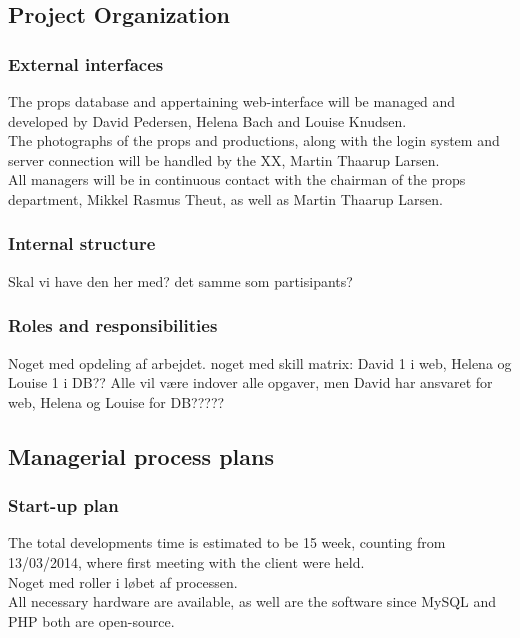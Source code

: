 \documentclass[12pt]{article}
\begin{document}
\subsection{Project Organization}
\subsubsection{External interfaces}
The props database and appertaining web-interface will be managed and developed by David Pedersen, Helena Bach and Louise Knudsen. \\
The photographs of the props and productions, along with the login system and server connection will be handled by the XX, Martin Thaarup Larsen. \\
All managers will be in continuous contact with the chairman of the props department, Mikkel Rasmus Theut, as well as Martin Thaarup Larsen. \\
\subsubsection{Internal structure}
Skal vi have den her med? det samme som partisipants?
\subsubsection{Roles and responsibilities}
Noget med opdeling af arbejdet. noget med skill matrix: David 1 i web, Helena og Louise 1 i DB?? Alle vil være indover alle opgaver, men David har ansvaret for web, Helena og Louise for DB?????
\subsection{Managerial process plans}
\subsubsection{Start-up plan}
The total developments time is estimated to be 15 week, counting from 13/03/2014, where first meeting with the client were held. \\
Noget med roller i løbet af processen. \\
All necessary hardware are available, as well are the software since MySQL and PHP both are open-source.
\end{document}
